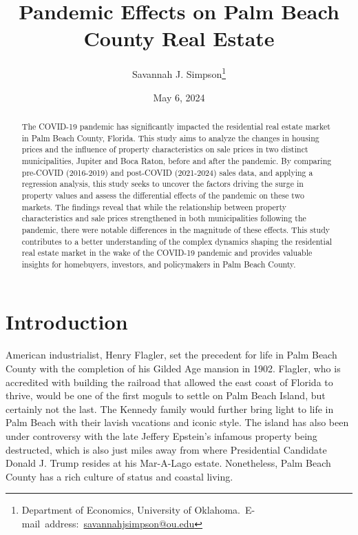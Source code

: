 \documentclass[12pt,english]{article}
\begin{document}
\begin{singlespace}
\title{Pandemic Effects on Palm Beach County Real Estate}
\end{singlespace}

\author{Savannah J. Simpson\thanks{Department of Economics, University of Oklahoma.\
E-mail~address:~\href{mailto:student.name@ou.edu}{savannahjsimpson@ou.edu}}}

\date{May 6, 2024}

\maketitle

\begin{abstract}
The COVID-19 pandemic has significantly impacted the residential real estate market in Palm Beach County, Florida. This study aims to analyze the changes in housing prices and the influence of property characteristics on sale prices in two distinct municipalities, Jupiter and Boca Raton, before and after the pandemic. By comparing pre-COVID (2016-2019) and post-COVID (2021-2024) sales data, and applying a regression analysis, this study seeks to uncover the factors driving the surge in property values and assess the differential effects of the pandemic on these two markets. The findings reveal that while the relationship between property characteristics and sale prices strengthened in both municipalities following the pandemic, there were notable differences in the magnitude of these effects. This study contributes to a better understanding of the complex dynamics shaping the residential real estate market in the wake of the COVID-19 pandemic and provides valuable insights for homebuyers, investors, and policymakers in Palm Beach County.
\end{abstract}
\vfill{}


\pagebreak{}


\section{Introduction}\label{sec:intro}
\indent American industrialist, Henry Flagler, set the precedent for life in Palm Beach County with the completion of his Gilded Age mansion in 1902. Flagler, who is accredited with building the railroad that allowed the east coast of Florida to thrive, would be one of the first moguls to settle on Palm Beach Island, but certainly not the last. The Kennedy family would further bring light to life in Palm Beach with their lavish vacations and iconic style. The island has also been under controversy with the late Jeffery Epstein's infamous property being destructed, which is also just miles away from where Presidential Candidate Donald J. Trump resides at his Mar-A-Lago estate. Nonetheless, Palm Beach County has a rich culture of status and coastal living. 
\end{document}
